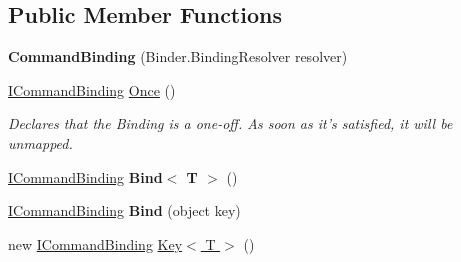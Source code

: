 \subsection*{Public Member Functions}
\begin{DoxyCompactItemize}
\item 
\hypertarget{classstrange_1_1extensions_1_1command_1_1impl_1_1_command_binding_a2363022e91a8f9f676d20c87bc3944e3}{{\bfseries Command\-Binding} (Binder.\-Binding\-Resolver resolver)}\label{classstrange_1_1extensions_1_1command_1_1impl_1_1_command_binding_a2363022e91a8f9f676d20c87bc3944e3}

\item 
\hypertarget{classstrange_1_1extensions_1_1command_1_1impl_1_1_command_binding_a8e9748be1b68811006095c2b91b226f6}{\hyperlink{interfacestrange_1_1extensions_1_1command_1_1api_1_1_i_command_binding}{I\-Command\-Binding} \hyperlink{classstrange_1_1extensions_1_1command_1_1impl_1_1_command_binding_a8e9748be1b68811006095c2b91b226f6}{Once} ()}\label{classstrange_1_1extensions_1_1command_1_1impl_1_1_command_binding_a8e9748be1b68811006095c2b91b226f6}

\begin{DoxyCompactList}\small\item\em Declares that the Binding is a one-\/off. As soon as it's satisfied, it will be unmapped. \end{DoxyCompactList}\item 
\hypertarget{classstrange_1_1extensions_1_1command_1_1impl_1_1_command_binding_ad71805e2d0c3194b533300494b13f0d1}{\hyperlink{interfacestrange_1_1extensions_1_1command_1_1api_1_1_i_command_binding}{I\-Command\-Binding} {\bfseries Bind$<$ T $>$} ()}\label{classstrange_1_1extensions_1_1command_1_1impl_1_1_command_binding_ad71805e2d0c3194b533300494b13f0d1}

\item 
\hypertarget{classstrange_1_1extensions_1_1command_1_1impl_1_1_command_binding_aeaf1b24c60fa5d6ba71de110ee568745}{\hyperlink{interfacestrange_1_1extensions_1_1command_1_1api_1_1_i_command_binding}{I\-Command\-Binding} {\bfseries Bind} (object key)}\label{classstrange_1_1extensions_1_1command_1_1impl_1_1_command_binding_aeaf1b24c60fa5d6ba71de110ee568745}

\item 
\hypertarget{classstrange_1_1extensions_1_1command_1_1impl_1_1_command_binding_a53f2f4e794ecd2a09afb29eab5b3ab6c}{new \hyperlink{interfacestrange_1_1extensions_1_1command_1_1api_1_1_i_command_binding}{I\-Command\-Binding} \hyperlink{classstrange_1_1extensions_1_1command_1_1impl_1_1_command_binding_a53f2f4e794ecd2a09afb29eab5b3ab6c}{Key$<$ T $>$} ()}\label{classstrange_1_1extensions_1_1command_1_1impl_1_1_command_binding_a53f2f4e794ecd2a09afb29eab5b3ab6c}


\end{DoxyCompactItemize}
